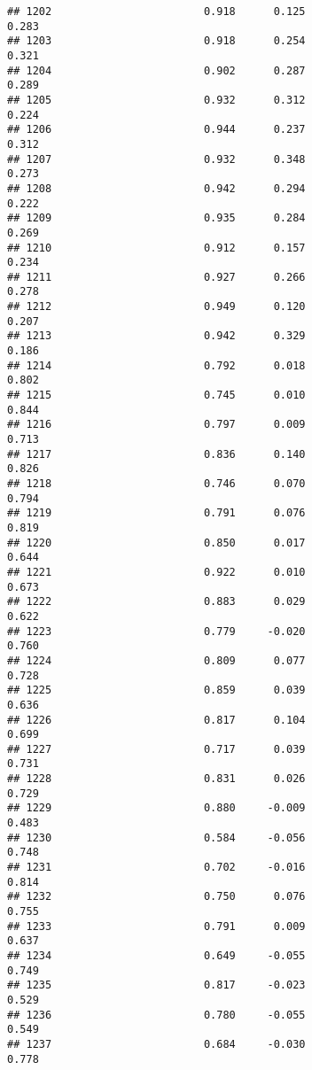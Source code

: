 \documentclass[
]{article}
\begin{document}
\begin{verbatim}
## 1202                        0.918      0.125                     0.283
## 1203                        0.918      0.254                     0.321
## 1204                        0.902      0.287                     0.289
## 1205                        0.932      0.312                     0.224
## 1206                        0.944      0.237                     0.312
## 1207                        0.932      0.348                     0.273
## 1208                        0.942      0.294                     0.222
## 1209                        0.935      0.284                     0.269
## 1210                        0.912      0.157                     0.234
## 1211                        0.927      0.266                     0.278
## 1212                        0.949      0.120                     0.207
## 1213                        0.942      0.329                     0.186
## 1214                        0.792      0.018                     0.802
## 1215                        0.745      0.010                     0.844
## 1216                        0.797      0.009                     0.713
## 1217                        0.836      0.140                     0.826
## 1218                        0.746      0.070                     0.794
## 1219                        0.791      0.076                     0.819
## 1220                        0.850      0.017                     0.644
## 1221                        0.922      0.010                     0.673
## 1222                        0.883      0.029                     0.622
## 1223                        0.779     -0.020                     0.760
## 1224                        0.809      0.077                     0.728
## 1225                        0.859      0.039                     0.636
## 1226                        0.817      0.104                     0.699
## 1227                        0.717      0.039                     0.731
## 1228                        0.831      0.026                     0.729
## 1229                        0.880     -0.009                     0.483
## 1230                        0.584     -0.056                     0.748
## 1231                        0.702     -0.016                     0.814
## 1232                        0.750      0.076                     0.755
## 1233                        0.791      0.009                     0.637
## 1234                        0.649     -0.055                     0.749
## 1235                        0.817     -0.023                     0.529
## 1236                        0.780     -0.055                     0.549
## 1237                        0.684     -0.030                     0.778

\end{verbatim}
\end{document}
